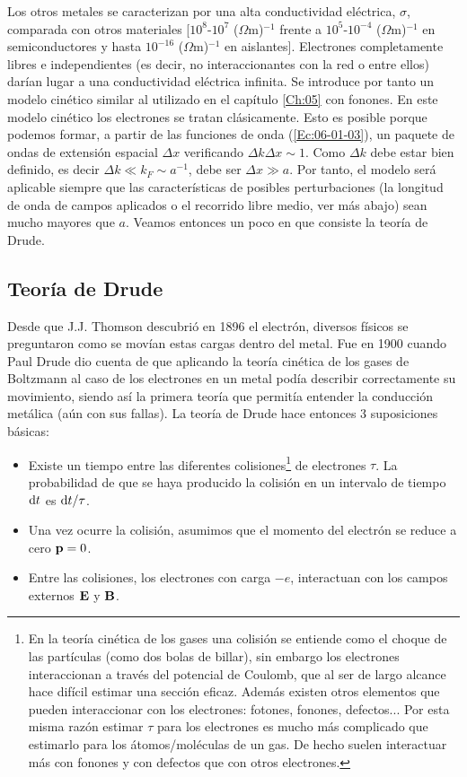 Los otros metales se caracterizan por una alta conductividad eléctrica, $\sigma$, comparada con otros materiales [$10^8$-$10^7$ ($\Omega$m)$^{-1}$ frente a $10^5$-$10^{-4}$ ($\Omega$m)$^{-1}$ en semiconductores y hasta $10^{-16}$ ($\Omega$m)$^{-1}$ en aislantes]. Electrones completamente libres e independientes (es decir, no interaccionantes con la red o entre ellos) darían lugar a una conductividad eléctrica infinita. Se introduce por tanto un modelo cinético similar al utilizado en el capítulo \ref{Ch:05} con fonones. En este modelo cinético los electrones se tratan clásicamente. Esto es posible porque podemos formar, a partir de las funciones de onda (\ref{Ec:06-01-03}), un paquete de ondas de extensión espacial $\Delta x$ verificando $\Delta k \Delta x \sim 1$. Como $\Delta k$ debe estar bien definido, es decir $\Delta k \ll k_F \sim a^{-1}$, debe ser $\Delta x \gg a$. Por tanto, el modelo será aplicable siempre que las características de posibles perturbaciones (la longitud de onda de campos aplicados o el recorrido libre medio, ver más abajo) sean mucho mayores que $a$. Veamos entonces un poco en que consiste la teoría de Drude.

\subsection{Teoría de Drude}

Desde que J.J. Thomson descubrió en 1896 el electrón, diversos físicos se preguntaron como se movían estas cargas dentro del metal. Fue en 1900 cuando Paul Drude dio cuenta de que aplicando la teoría cinética de los gases de Boltzmann al caso de los electrones en un metal podía describir correctamente su movimiento, siendo así la primera teoría que permitía entender la conducción metálica (aún con sus fallas). La teoría de Drude hace entonces 3 suposiciones básicas:

\begin{itemize}
	\item Existe un tiempo entre las diferentes colisiones\footnote{En la teoría cinética de los gases una colisión se entiende como el choque de las partículas (como dos bolas de billar), sin embargo los electrones interaccionan a través del potencial de Coulomb, que al ser de largo alcance hace difícil estimar una sección eficaz. Además existen otros elementos que pueden interaccionar con los electrones: fotones, fonones, defectos... Por esta misma razón estimar $\tau$ para los electrones es mucho más complicado que estimarlo para los átomos/moléculas de un gas. De hecho suelen interactuar más con fonones y con defectos que con otros electrones.} de electrones $\tau$. La probabilidad de que se haya producido la colisión en un intervalo de tiempo $\mathrm{d} t$ es $\mathrm{d} t /\tau$. 
	\item Una vez ocurre la colisión, asumimos que el momento del electrón se reduce a cero $\mathbf{p}=0$.
	\item Entre las colisiones, los electrones con carga $-e$, interactuan con los campos externos $\mathbf{E}$ y $\mathbf{B}$.
\end{itemize}

